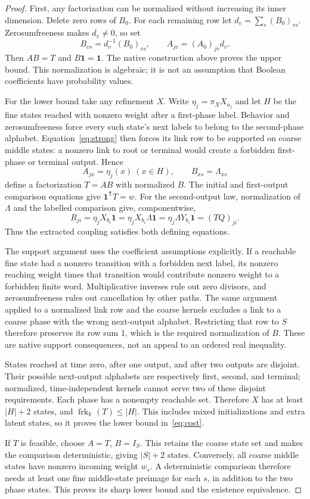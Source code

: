 \documentclass[11pt]{article}
\newcommand{\K}{\mathbb K}
\newcommand{\one}{\mathbf 1}
\newcommand{\frk}{\operatorname{frk}}
\theoremstyle{remark}
\begin{document}
\begin{proof}
First, any factorization can be normalized without increasing its inner dimension. Delete zero rows of $B_0$. For each remaining row let $d_v=\sum_s(B_0)_{vs}$. Zerosumfreeness makes $d_v\ne0$, so set
\[
 B_{vs}=d_v^{-1}(B_0)_{vs},\qquad
 A_{jv}=(A_0)_{jv}d_v.
\]
Then $AB=T$ and $B\one=\one$. The native construction above proves the upper bound. This normalization is algebraic; it is not an assumption that Boolean coefficients have probability values.

For the lower bound take any refinement $X$. Write $\eta_j=\pi_XX_{a_j}$ and let $H$ be the fine states reached with nonzero weight after a first-phase label. Behavior and zerosumfreeness force every such state's next labels to belong to the second-phase alphabet. Equation~\eqref{eq:strong} then forces its link row to be supported on coarse middle states: a nonzero link to root or terminal would create a forbidden first-phase or terminal output. Hence
\[
 A_{jx}=\eta_j(x)\ (x\in H),\qquad B_{xs}=\Lambda_{xs}
\]
define a factorization $T=AB$ with normalized $B$. The initial and first-output comparison equations give $\one^{\mathsf T}T=w$. For the second-output law, normalization of $\Lambda$ and the labelled comparison give, componentwise,
\[
 R_{ji}=\eta_jX_{b_i}\one
 =\eta_jX_{b_i}\Lambda\one
 =\eta_j\Lambda Y_{b_i}\one
 =(TQ)_{ji}.
\]
Thus the extracted coupling satisfies both defining equations.

The support argument uses the coefficient assumptions explicitly. If a reachable fine state had a nonzero transition with a forbidden next label, its nonzero reaching weight times that transition would contribute nonzero weight to a forbidden finite word. Multiplicative inverses rule out zero divisors, and zerosumfreeness rules out cancellation by other paths. The same argument applied to a normalized link row and the coarse kernels excludes a link to a coarse phase with the wrong next-output alphabet. Restricting that row to $S$ therefore preserves its row sum $1$, which is the required normalization of $B$. These are native support consequences, not an appeal to an ordered real inequality.

States reached at time zero, after one output, and after two outputs are disjoint. Their possible next-output alphabets are respectively first, second, and terminal; normalized, time-independent kernels cannot serve two of these disjoint requirements. Each phase has a nonempty reachable set. Therefore $X$ has at least $|H|+2$ states, and $\frk_\K(T)\le|H|$. This includes mixed initializations and extra latent states, so it proves the lower bound in~\eqref{eq:cost}.

If $T$ is feasible, choose $A=T$, $B=I_S$. This retains the coarse state set and makes the comparison deterministic, giving $|S|+2$ states. Conversely, all coarse middle states have nonzero incoming weight $w_s$. A deterministic comparison therefore needs at least one fine middle-state preimage for each $s$, in addition to the two phase states. This proves its sharp lower bound and the existence equivalence.
\end{proof}
\end{document}
